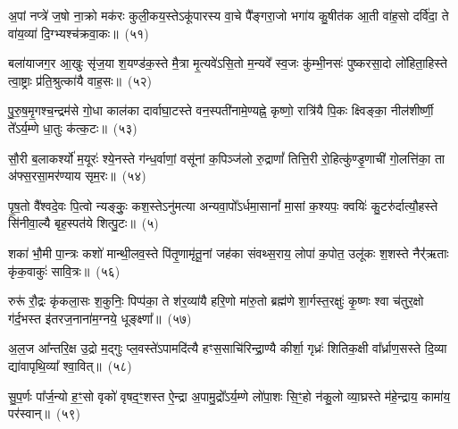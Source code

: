 {\anuvakamend[{म॒युस्त्रयो॑विꣳशतिः}]}%

अ॒पां नप्त्रे॑ ज॒षो ना॒क्रो मक॑रः कुली॒कय॒स्ते\-ऽकू॑पारस्य वा॒चे पै᳚ङ्गरा॒जो भगा॑य कु॒षीत॑क आ॒ती वा॑ह॒सो दर्वि॑दा॒ ते वा॑य॒व्या॑ दि॒ग्भ्यश्च॑क्रवा॒कः॥~(५१)

{\anuvakamend[{अ॒पामेका॒न्नविꣳ॑शतिः}]}%

बला॑याजग॒र आ॒खुः सृ॑ज॒या श॒यण्ड॑क॒स्ते मै॒त्रा मृ॒त्यवे॑\-ऽसि॒तो म॒न्यवे᳚ स्व॒जः कु॑म्भी॒नसः॑ पुष्करसा॒दो लो॑हिता॒हिस्ते त्वा॒ष्ट्राः प्र॑ति॒श्रुत्का॑यै वाह॒सः॥~(५२)

{\anuvakamend[{}]}

पु॒रु॒ष॒मृ॒गश्च॒न्द्रम॑से गो॒धा काल॑का दार्वाघा॒टस्ते वन॒स्पती॑नामे॒ण्यह्ने॒ कृष्णो॒ रात्रि॑यै पि॒कः क्ष्विङ्का॒ नील॑शीर्ष्णी॒ ते᳚\-ऽर्य॒म्णे धा॒तुः क॑त्क॒टः॥~(५३)

{\anuvakamend[{}]}

सौ॒री ब॒लाकर्श्यो॑ म॒यूरः॑ श्ये॒नस्ते ग॑न्ध॒र्वाणां॒ वसू॑नां क॒पिञ्ज॑लो रु॒द्राणां᳚ तित्ति॒री रो॒हित्कु॑ण्डृ॒णाची॑ गो॒लत्ति॑का॒ ता अ॑फ्स॒रसा॒मर॑ण्याय सृम॒रः॥~(५४)

{\anuvakamend[{}]}

पृ॒ष॒तो वै᳚श्वदे॒वः पि॒त्वो न्यङ्कुः॒ कश॒स्ते\-ऽनु॑मत्या अन्यवा॒पो᳚\-ऽर्धमा॒सानां᳚ मा॒सां क॒श्यपः॒ क्वयिः॑ कु॒टरु॑र्दात्यौ॒हस्ते सि॑नीवा॒ल्यै बृह॒स्पत॑ये शित्पु॒टः॥~(५)

{\anuvakamend[{}]}

शका॑ भौ॒मी पा॒न्त्रः कशो॑ मान्थी॒लव॒स्ते पि॑तृ॒णामृ॑तू॒नां जह॑का संवथ्स॒राय॒ लोपा॑ क॒पोत॒ उलू॑कः श॒शस्ते नैर्॑\mbox{}॑ऋताः कृ॑क॒वाकुः॑ सावि॒त्रः॥~(५६)

{\anuvakamend[{बला॑य पुरुषमृ॒गः सौ॒री पृ॑ष॒तः शका॒ष्टाद॑शा॒ष्टाद॑श}]}%

रुरू॑ रौ॒द्रः कृ॑कला॒सः श॒कुनिः॒ पिप्प॑का॒ ते श॑र॒व्या॑यै हरि॒णो मा॑रु॒तो ब्रह्म॑णे शा॒र्गस्त॒रक्षुः॑ कृ॒ष्णः श्वा च॑तुर॒क्षो ग॑र्द॒भस्त इ॑तरज॒नाना॑म॒ग्नये॒ धूङ्क्ष्णा᳚॥~(५७)

{\anuvakamend[{रुरु॑र्विꣳश॒तिः}]}%

अ॒ल॒ज आ᳚न्तरि॒क्ष उ॒द्रो म॒द्गुः प्ल॒वस्ते॑\-ऽपामदि॑त्यै हꣳस॒साचि॑रिन्द्रा॒ण्यै कीर्\mbox{}शा॒ गृध्रः॑ शितिक॒क्षी वा᳚र्ध्राण॒सस्ते दि॒व्या द्या॑वापृथि॒व्या᳚ श्वा॒वित्॥~(५८)

{\anuvakamend[{}]}

सु॒प॒र्णः पा᳚र्ज॒न्यो ह॒ꣳ॒सो वृको॑ वृषद॒ꣳ॒शस्त ऐ॒न्द्रा अ॒पामु॒द्रो᳚\-ऽर्य॒म्णे लो॑पा॒शः सि॒ꣳ॒हो न॑कु॒लो व्या॒घ्रस्ते म॑हे॒न्द्राय॒ कामा॑य॒ पर॑स्वान्॥~(५९)

